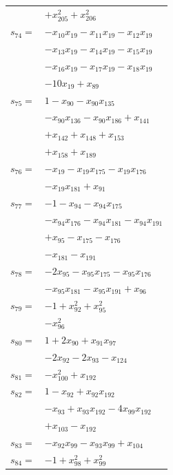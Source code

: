 \begin{longtable}{@{}r@{\;}l@{}}
 & \(\displaystyle +x_{205}^{2} +x_{206}^{2}\) \\[3pt]
\(s_{74}=\) & \(\displaystyle -x_{10}x_{19} -x_{11}x_{19} -x_{12}x_{19}\) \\
 & \(\displaystyle -x_{13}x_{19} -x_{14}x_{19} -x_{15}x_{19}\) \\
 & \(\displaystyle -x_{16}x_{19} -x_{17}x_{19} -x_{18}x_{19}\) \\
 & \(\displaystyle -10x_{19} +x_{89}\) \\[3pt]
\(s_{75}=\) & \(\displaystyle 1 -x_{90} -x_{90}x_{135}\) \\
 & \(\displaystyle -x_{90}x_{136} -x_{90}x_{186} +x_{141}\) \\
 & \(\displaystyle +x_{142} +x_{148} +x_{153}\) \\
 & \(\displaystyle +x_{158} +x_{189}\) \\[3pt]
\(s_{76}=\) & \(\displaystyle -x_{19} -x_{19}x_{175} -x_{19}x_{176}\) \\
 & \(\displaystyle -x_{19}x_{181} +x_{91}\) \\[3pt]
\(s_{77}=\) & \(\displaystyle -1 -x_{94} -x_{94}x_{175}\) \\
 & \(\displaystyle -x_{94}x_{176} -x_{94}x_{181} -x_{94}x_{191}\) \\
 & \(\displaystyle +x_{95} -x_{175} -x_{176}\) \\
 & \(\displaystyle -x_{181} -x_{191}\) \\[3pt]
\(s_{78}=\) & \(\displaystyle -2x_{95} -x_{95}x_{175} -x_{95}x_{176}\) \\
 & \(\displaystyle -x_{95}x_{181} -x_{95}x_{191} +x_{96}\) \\[3pt]
\(s_{79}=\) & \(\displaystyle -1 +x_{92}^{2} +x_{95}^{2}\) \\
 & \(\displaystyle -x_{96}^{2}\) \\[3pt]
\(s_{80}=\) & \(\displaystyle 1 +2x_{90} +x_{91}x_{97}\) \\
 & \(\displaystyle -2x_{92} -2x_{93} -x_{124}\) \\[3pt]
\(s_{81}=\) & \(\displaystyle -x_{100}^{2} +x_{192}\) \\[3pt]
\(s_{82}=\) & \(\displaystyle 1 -x_{92} +x_{92}x_{192}\) \\
 & \(\displaystyle -x_{93} +x_{93}x_{192} -4x_{99}x_{192}\) \\
 & \(\displaystyle +x_{103} -x_{192}\) \\[3pt]
\(s_{83}=\) & \(\displaystyle -x_{92}x_{99} -x_{93}x_{99} +x_{104}\) \\[3pt]
\(s_{84}=\) & \(\displaystyle -1 +x_{98}^{2} +x_{99}^{2}\) \\

\end{longtable}
